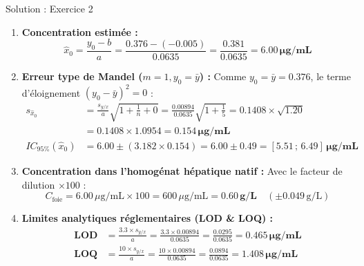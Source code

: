\documentclass[11pt,a4paper]{article}
\begin{document}
\begin{solutionbox}{Solution : Exercice 2}
\begin{enumerate}[label=\textbf{\alph*.}]
  \item \textbf{Concentration estimée :}
  \begin{equation*}
    \hat{x}_0 = \frac{y_0 - b}{a} = \frac{0.376 - (-0.005)}{0.0635} = \frac{0.381}{0.0635} = \mathbf{6.00\,\mu\text{g/mL}}
  \end{equation*}
  \item \textbf{Erreur type de Mandel ($m = 1, y_0 = \bar{y}$) :}
  Comme $y_0 = \bar{y} = 0.376$, le terme d'éloignement $(y_0 - \bar{y})^2 = 0$ :
  \begin{align*}
    s_{\hat{x}_0} &= \frac{s_{y/x}}{a} \sqrt{1 + \frac{1}{n} + 0} = \frac{0.00894}{0.0635} \sqrt{1 + \frac{1}{5}} = 0.1408 \times \sqrt{1.20} \\
    &= 0.1408 \times 1.0954 = \mathbf{0.154\,\mu\text{g/mL}} \\[1mm]
    IC_{95\%}(\hat{x}_0) &= 6.00 \pm (3.182 \times 0.154) = 6.00 \pm 0.49 = \mathbf{[5.51 \,;\, 6.49]\,\mu\text{g/mL}}
  \end{align*}
  \item \textbf{Concentration dans l'homogénat hépatique natif :}
  Avec le facteur de dilution $\times 100$ :
  \begin{equation*}
    C_{\text{foie}} = 6.00\,\mu\text{g/mL} \times 100 = 600\,\mu\text{g/mL} = \mathbf{0.60\,\text{g/L}} \quad (\pm 0.049\,\text{g/L})
  \end{equation*}
  \item \textbf{Limites analytiques réglementaires (LOD \& LOQ) :}
  \begin{align*}
    \mathbf{LOD} &= \frac{3.3 \times s_{y/x}}{a} = \frac{3.3 \times 0.00894}{0.0635} = \frac{0.0295}{0.0635} = \mathbf{0.465\,\mu\text{g/mL}} \\[1mm]
    \mathbf{LOQ} &= \frac{10 \times s_{y/x}}{a} = \frac{10 \times 0.00894}{0.0635} = \frac{0.0894}{0.0635} = \mathbf{1.408\,\mu\text{g/mL}}
  \end{align*}
\end{enumerate}
\end{solutionbox}
\end{document}
